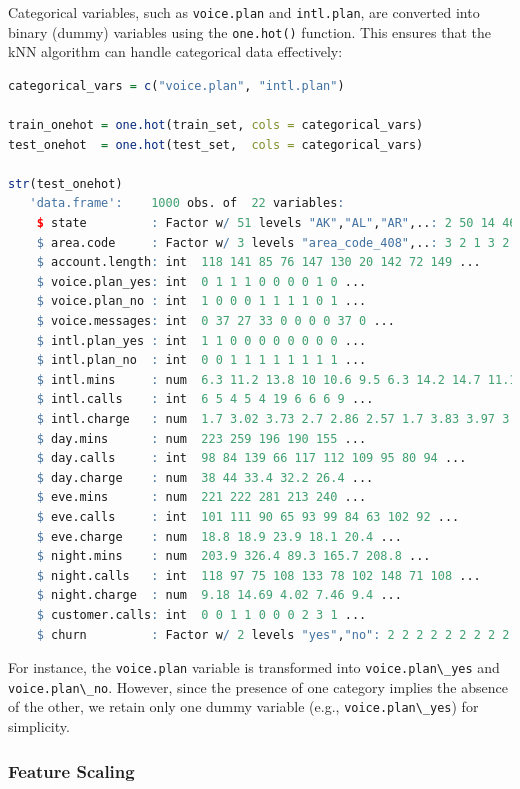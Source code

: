 \documentclass[
]{book}
\newcommand{\passthrough}[1]{#1}
\theoremstyle{definition}
\theoremstyle{definition}
\theoremstyle{definition}
\theoremstyle{definition}
\theoremstyle{remark}
\begin{document}
Categorical variables, such as \passthrough{\lstinline!voice.plan!} and \passthrough{\lstinline!intl.plan!}, are converted into binary (dummy) variables using the \passthrough{\lstinline!one.hot()!} function. This ensures that the kNN algorithm can handle categorical data effectively:

\begin{lstlisting}[language=R]
categorical_vars = c("voice.plan", "intl.plan")

train_onehot = one.hot(train_set, cols = categorical_vars)
test_onehot  = one.hot(test_set,  cols = categorical_vars)

str(test_onehot)
   'data.frame':    1000 obs. of  22 variables:
    $ state         : Factor w/ 51 levels "AK","AL","AR",..: 2 50 14 46 10 4 25 15 11 32 ...
    $ area.code     : Factor w/ 3 levels "area_code_408",..: 3 2 1 3 2 2 2 2 2 1 ...
    $ account.length: int  118 141 85 76 147 130 20 142 72 149 ...
    $ voice.plan_yes: int  0 1 1 1 0 0 0 0 1 0 ...
    $ voice.plan_no : int  1 0 0 0 1 1 1 1 0 1 ...
    $ voice.messages: int  0 37 27 33 0 0 0 0 37 0 ...
    $ intl.plan_yes : int  1 1 0 0 0 0 0 0 0 0 ...
    $ intl.plan_no  : int  0 0 1 1 1 1 1 1 1 1 ...
    $ intl.mins     : num  6.3 11.2 13.8 10 10.6 9.5 6.3 14.2 14.7 11.1 ...
    $ intl.calls    : int  6 5 4 5 4 19 6 6 6 9 ...
    $ intl.charge   : num  1.7 3.02 3.73 2.7 2.86 2.57 1.7 3.83 3.97 3 ...
    $ day.mins      : num  223 259 196 190 155 ...
    $ day.calls     : int  98 84 139 66 117 112 109 95 80 94 ...
    $ day.charge    : num  38 44 33.4 32.2 26.4 ...
    $ eve.mins      : num  221 222 281 213 240 ...
    $ eve.calls     : int  101 111 90 65 93 99 84 63 102 92 ...
    $ eve.charge    : num  18.8 18.9 23.9 18.1 20.4 ...
    $ night.mins    : num  203.9 326.4 89.3 165.7 208.8 ...
    $ night.calls   : int  118 97 75 108 133 78 102 148 71 108 ...
    $ night.charge  : num  9.18 14.69 4.02 7.46 9.4 ...
    $ customer.calls: int  0 0 1 1 0 0 0 2 3 1 ...
    $ churn         : Factor w/ 2 levels "yes","no": 2 2 2 2 2 2 2 2 2 2 ...
\end{lstlisting}

For instance, the \passthrough{\lstinline!voice.plan!} variable is transformed into \passthrough{\lstinline!voice.plan\_yes!} and \passthrough{\lstinline!voice.plan\_no!}. However, since the presence of one category implies the absence of the other, we retain only one dummy variable (e.g., \passthrough{\lstinline!voice.plan\_yes!}) for simplicity.

\subsubsection*{Feature Scaling}\label{feature-scaling-2}
\end{document}
